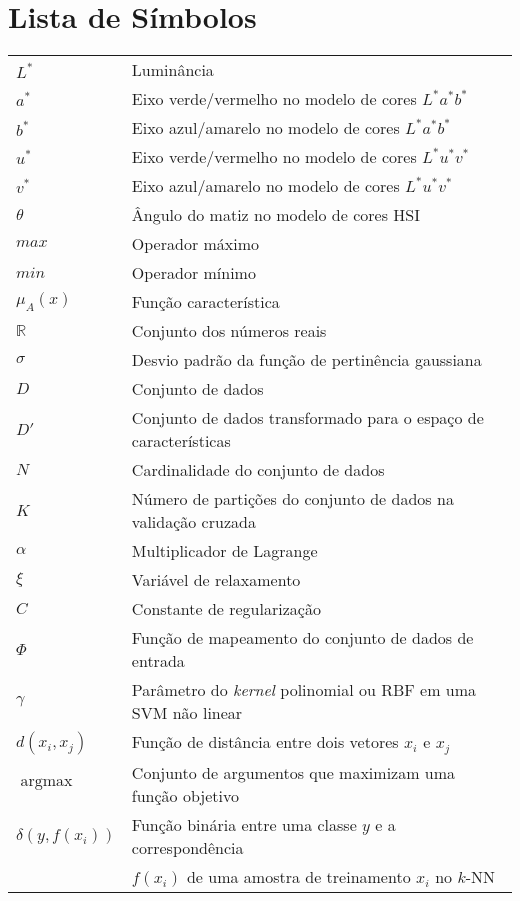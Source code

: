 \documentclass[11pt,twoside,a4paper]{book}
\theoremstyle{plain}
\theoremstyle{definition}
\DeclareMathOperator*{\argmax}{argmax}
\begin{document}
\chapter{Lista de Símbolos}
\begin{tabular}{ll}
    $L^*$       & Luminância \\
    $a^*$       & Eixo verde/vermelho no modelo de cores $L^*a^*b^*$ \\
    $b^*$       & Eixo azul/amarelo no modelo de cores $L^*a^*b^*$ \\
    $u^*$       & Eixo verde/vermelho no modelo de cores $L^*u^*v^*$ \\
    $v^*$       & Eixo azul/amarelo no modelo de cores $L^*u^*v^*$ \\
    $\theta$    & Ângulo do matiz no modelo de cores HSI\\
    $max$       & Operador máximo\\
    $min$       & Operador mínimo\\
    $\mu_A(x)$  & Função característica\\
    $\mathbb{R}$& Conjunto dos números reais\\
    $\sigma$    & Desvio padrão da função de pertinência gaussiana\\
    $D$         & Conjunto de dados\\
    $D'$        & Conjunto de dados transformado para o espaço de características\\
    $N$         & Cardinalidade do conjunto de dados\\
    $K$         & Número de partições do conjunto de dados na validação cruzada\\
    $\alpha$    & Multiplicador de Lagrange\\
    $\xi$       & Variável de relaxamento\\
    $C$         & Constante de regularização\\
    $\Phi$      & Função de mapeamento do conjunto de dados de entrada\\
    $\gamma$    & Parâmetro do \emph{kernel} polinomial ou RBF em uma SVM não linear\\
    $d(x_i, x_j)$ & Função de distância entre dois vetores $x_i$ e $x_j$\\
    $\argmax$   & Conjunto de argumentos que maximizam uma função objetivo\\
    $\delta (y, f(x_i))$ & Função binária entre uma classe $y$ e a correspondência \\
                & $f(x_i)$ de uma amostra de treinamento $x_i$ no $k$-NN
\end{tabular}
\end{document}
